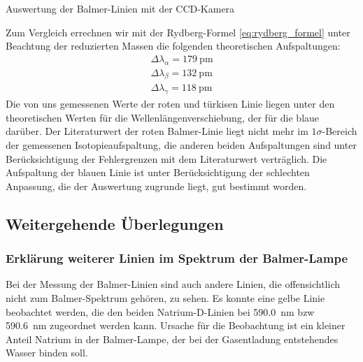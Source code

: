 \documentclass[11pt, a4paper]{article}
\numberwithin{equation}{section}
\begin{document}
\begin{table}[h]
\centering

\caption{Auswertung der Balmer-Linien mit der CCD-Kamera}
\label{tab:balmer_ccd_auswertung}
\end{table}
\noindent
Zum Vergleich errechnen wir mit der Rydberg-Formel \eqref{eq:rydberg_formel} unter Beachtung der reduzierten Massen die folgenden theoretischen Aufspaltungen:
\begin{align}
\Delta\lambda_\alpha=\SI{179}{\pico\metre}\\
\Delta\lambda_\beta=\SI{132}{\pico\metre}\\
\Delta\lambda_\gamma=\SI{118}{\pico\metre}
\end{align}
Die von uns gemessenen Werte der roten und türkisen Linie liegen unter den theoretischen Werten für die Wellenlängenverschiebung, der für die blaue darüber.
Der Literaturwert der roten Balmer-Linie liegt nicht mehr im $1\sigma$-Bereich der gemessenen Isotopieaufspaltung, die anderen beiden Aufspaltungen sind unter Berücksichtigung der Fehlergrenzen mit dem Literaturwert verträglich.
Die Aufspaltung der blauen Linie ist unter Berücksichtigung der schlechten Anpassung, die der Auswertung zugrunde liegt, gut bestimmt worden.
\FloatBarrier
\subsection{Weitergehende Überlegungen}

\subsubsection{Erklärung weiterer Linien im Spektrum der Balmer-Lampe}

Bei der Messung der Balmer-Linien sind auch andere Linien, die offensichtlich nicht zum Balmer-Spektrum gehören, zu sehen. Es konnte eine gelbe Linie beobachtet werden, die den beiden Natrium-D-Linien bei \SI{590.0}{\nano\metre} bzw \SI{590.6}{\nano\metre} zugeordnet werden kann.
Ursache für die Beobachtung ist ein kleiner Anteil Natrium in der Balmer-Lampe, der bei der Gasentladung entstehendes Wasser binden soll.
\end{document}
